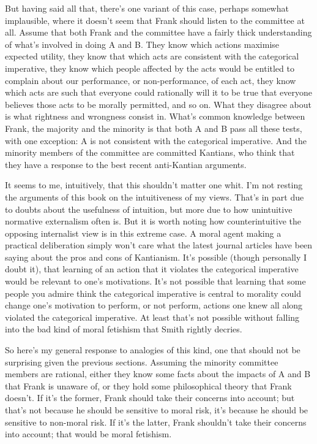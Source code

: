 But having said all that, there's one variant of this case, perhaps somewhat implausible, where it doesn't seem that \gls{Frank} should listen to the committee at all. Assume that both \gls{Frank} and the committee have a fairly thick understanding of what's involved in doing A and B. They know which actions maximise expected utility, they know that which acts are consistent with the categorical imperative, they know which people affected by the acts would be entitled to complain about our performance, or non-performance, of each act, they know which acts are such that everyone could rationally will it to be true that everyone believes those acts to be morally permitted, and so on. What they disagree about is what rightness and wrongness consist in. What's common knowledge between \gls{Frank}, the majority and the minority is that both A and B pass all these tests, with one exception: A is not consistent with the categorical imperative. And the minority members of the committee are committed Kantians, who think that they have a response to the best recent anti-Kantian arguments.

It seems to me, intuitively, that this shouldn't matter one whit. I'm not resting the arguments of this book on the intuitiveness of my views. That's in part due to doubts about the usefulness of intuition, but more due to how unintuitive normative externalism often is. But it is worth noting how counterintuitive the opposing internalist view is in this extreme case. A moral agent making a practical deliberation simply won't care what the latest journal articles have been saying about the pros and cons of Kantianism. It's possible (though personally I doubt it), that learning of an action that it violates the categorical imperative would be relevant to one's motivations. It's not possible that learning that some people you admire think the categorical imperative is central to morality could change one's motivation to perform, or not perform, actions one knew all along violated the categorical imperative. At least that's not possible without falling into the bad kind of moral fetishism that Smith rightly decries.

So here's my general response to analogies of this kind, one that should not be surprising given the previous sections. Assuming the minority committee members are rational, either they know some facts about the impacts of A and B that \gls{Frank} is unaware of, or they hold some philosophical theory that \gls{Frank} doesn't. If it's the former, \gls{Frank} should take their concerns into account; but that's not because he should be sensitive to moral risk, it's because he should be sensitive to non-moral risk. If it's the latter, \gls{Frank} shouldn't take their concerns into account; that would be moral fetishism.

